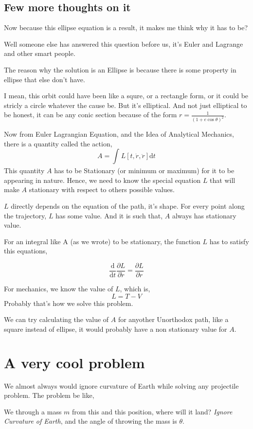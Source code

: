 \documentclass[12pt,a4paper]{article}
\newcommand{ \pk }[1]{\begin{problem} #1 \end{problem} }
\begin{document}
\subsection{ Few more thoughts on it }  
Now because this ellipse equation is a result, it makes me think why it has to be?

Well someone else has answered this question before us, it's Euler and Lagrange and other smart people.

The reason why the solution is an Ellipse is because there is some property in ellipse that else don't have.

I mean, this orbit could have been like a squre, or a rectangle form, or it could be stricly a circle whatever the cause be. But it's elliptical. And not just elliptical to be honest, it can be any conic section because of the form $r = \frac{1}{\left( 1+ e \cos \theta \right) ^2}$. 

Now from Euler Lagrangian Equation, and the Idea of Analytical Mechanics, there is a quantity called the action,
\[ 
    A = \int_{ }^{} L[t, \dot{r}, \ddot{ r }] \mathrm{d} t  
\]
This quantity $A$ has to be Stationary (or minimum or maximum) for it to be appearing in nature. Hence, we need to know the special equation $L$ that will make $A $ stationary with respect to others possible values.

$L$ directly depends on the equation of the path, it's shape. For every point along the trajectory, $L$ has some value. And it is such that, $A$ always has stationary value. 

For an integral like A (as we wrote) to be stationary, the function $L$ has to satisfy this equations, 

\[ 
\frac{\mathrm{d} }{\mathrm{d} t} \frac{\partial L}{\partial \dot{r}} = \frac{\partial L}{\partial r}
\]

For mechanics, we know the value of $L$, which is,
\[ 
L = T - V
\]
Probably that's how we solve this problem.

We can try calculating the value of $A$ for anyother Unorthodox path, like a square instead of ellipse, it would probably have a non stationary value for $A$. 


\section{ A very cool problem }
We almost always would ignore curvature of Earth while solving any projectile problem. The problem be like,

\pk{ We through a mass $m$ from this and this position, where will it land? \emph{Ignore Curvature of Earth}, and the angle of throwing the mass is $\theta$.  }
\end{document}
